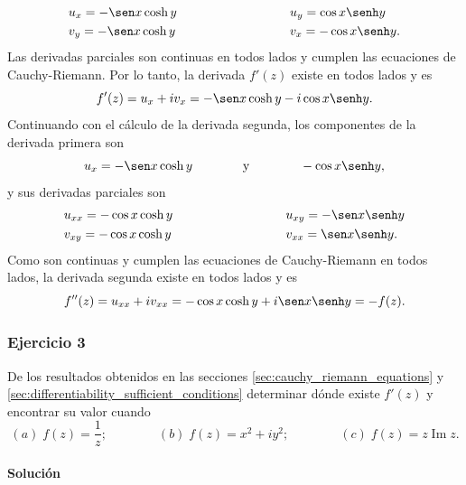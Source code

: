 \documentclass[a4paper]{report}
\renewcommand{\Im}{\operatorname{Im}}
\begin{document}
\begin{enumerate}
 \[
 \begin{array}{ll}
  u_x=-\sen x\cosh y\qquad\qquad\qquad\qquad&u_y=\cos x\senh y\\[\smallskipamount]
  v_y=-\sen x\cosh y\qquad\qquad\qquad\qquad&v_x=-\cos x\senh y.
 \end{array}
 \]
 Las derivadas parciales son continuas en todos lados y cumplen las ecuaciones de Cauchy-Riemann. Por lo tanto, la derivada \(f'(z)\) existe en todos lados y es
 \[
  f'(z)=u_x+iv_x=-\sen x\cosh y-i\cos x\senh y.
 \]
 Continuando con el cálculo de la derivada segunda, los componentes de la derivada primera son
 \[
  u_x=-\sen x\cosh y
  \qquad\qquad\textrm{y}\qquad\qquad
  -\cos x\senh y,
 \]
 y sus derivadas parciales son 
 \[
 \begin{array}{ll}
  u_{xx}=-\cos x\cosh y\qquad\qquad\qquad\qquad&u_{xy}=-\sen x\senh y\\[\smallskipamount]
  v_{xy}=-\cos x\cosh y\qquad\qquad\qquad\qquad&v_{xx}=\sen x\senh y.
 \end{array}
 \]
 Como son continuas y cumplen las ecuaciones de Cauchy-Riemann en todos lados, la derivada segunda existe en todos lados y es
 \[
  f''(z)=u_{xx}+iv_{xx}=-\cos x\cosh y+i\sen x\senh y=-f(z).
 \]
\end{enumerate}

\subsubsection{Ejercicio 3}

De los resultados obtenidos en las secciones \ref{sec:cauchy_riemann_equations} y \ref{sec:differentiability_sufficient_conditions} determinar dónde existe \(f'(z)\) y encontrar su valor cuando
\[
  (\textit{a})\;f(z)=\frac{1}{z};\qquad\qquad
  (\textit{b})\;f(z)=x^2+iy^2;\qquad\qquad
  (\textit{c})\;f(z)=z\Im z.
\]

\paragraph{Solución} 
\end{document}
